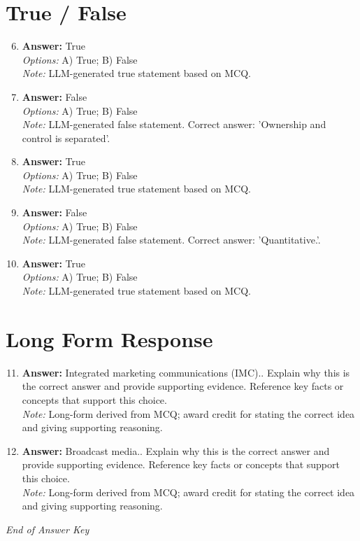 \documentclass[12pt]{article}
\begin{document}
\section*{True / False}
\begin{enumerate}[label=\arabic*.]
\setcounter{enumi}{5}
\item \textbf{Answer:} True
\\ \textit{Options:} A) True; B) False
\\ \textit{Note:} LLM-generated true statement based on MCQ.
\item \textbf{Answer:} False
\\ \textit{Options:} A) True; B) False
\\ \textit{Note:} LLM-generated false statement. Correct answer: 'Ownership and control is separated'.
\item \textbf{Answer:} True
\\ \textit{Options:} A) True; B) False
\\ \textit{Note:} LLM-generated true statement based on MCQ.
\item \textbf{Answer:} False
\\ \textit{Options:} A) True; B) False
\\ \textit{Note:} LLM-generated false statement. Correct answer: 'Quantitative.'.
\item \textbf{Answer:} True
\\ \textit{Options:} A) True; B) False
\\ \textit{Note:} LLM-generated true statement based on MCQ.
\end{enumerate}

\section*{Long Form Response}
\begin{enumerate}[label=\arabic*.]
\setcounter{enumi}{10}
\item \textbf{Answer:} Integrated marketing communications (IMC).. Explain why this is the correct answer and provide supporting evidence. Reference key facts or concepts that support this choice.
\\ \textit{Note:} Long-form derived from MCQ; award credit for stating the correct idea and giving supporting reasoning.
\item \textbf{Answer:} Broadcast media.. Explain why this is the correct answer and provide supporting evidence. Reference key facts or concepts that support this choice.
\\ \textit{Note:} Long-form derived from MCQ; award credit for stating the correct idea and giving supporting reasoning.
\end{enumerate}

\vfill
\noindent\textit{End of Answer Key}
\end{document}
